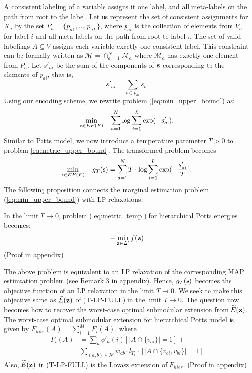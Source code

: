A consistent labeling of a variable assigns it one label, and all meta-labels on the path from root to the label. Let us represent the set of consistent assignments for $X_a$ by the set $P_a = \{p_{a1}, \dots, p_{aL}\}$, where $p_{ai}$ is the collection of elements from $V_a$ for label $i$ and all meta-labels on the path from root to label $i$. The set of valid labelings $A \subseteq V$ assigns each variable exactly one consistent label. This constraint can be formally written as $\mathcal{M} = \cap_{a = 1}^{N} \mathcal{M}_a$ where $\mathcal{M}_a$ has exactly one element from $P_a$. Let $s'_{ai}$ be the sum of the components of $\bf s$ corresponding to the elements
of $p_{ai}$, that is, 
\begin{equation}
s'_{ai} = \sum_{t \in p_{ai}} s_t.
\label{eq:tree_s}
\end{equation}
Using our encoding scheme, we rewrite problem (\ref{eq:min_upper_bound}) as:
\begin{equation}
\min_{{\bf s} \in EP(F)} \quad \sum_{a = 1}^{N} \log \sum_{i = 1}^L \exp(-s'_{ai}).
\label{eq:metric_upper_bound}
\end{equation}
%
 Similar to Potts model, we now introduce a temperature parameter $T > 0$ to problem \eqref{eq:metric_upper_bound}. The transformed problem becomes
\begin{equation}
    \min_{{\bf s} \in EP(F)} \quad g_T ({\bf s}) = \sum_{a = 1}^{N} T \cdot \log \sum_{i = 1}^L \exp(-\frac{s'_{ai}}{T}).
\label{eq:metric_temp}
\end{equation}
 The following proposition connects the marginal estimation problem (\ref{eq:min_upper_bound}) with LP relaxations:

{\proposition In the limit $T \to 0$, problem (\ref{eq:metric_temp}) for hierarchical Potts energies becomes:
\begin{align}
    - \min_{{\bf z} \in \Delta'} f({\bf z}) 
\end{align}
\label{proposition:metric_equiv}}
(Proof in appendix).

The above problem is equivalent to an LP relaxation of the corresponding MAP
estimtation problem (see Remark 3 in appendix). Hence, $g_T ({\bf s})$ becomes the objective function of an LP relaxation in the limit $T \to 0$. We seek to make this objective same as $\widetilde{E}({\bf z})$ of (T-LP-FULL) in the limit $T \to 0$. The question now becomes how to recover the  worst-case optimal submodular extension from $\widetilde{E}({\bf z})$.
%
{\proposition The  worst-case optimal submodular extension for hierarchical Potts model is given by $F_{hier}(A) = \sum_{i = 1}^M F_i(A)$, where
\begin{align}
    F_i(A) &= \sum_a \phi'_{a}(i) [|A \cap \{v_{ai}\}| = 1] + \nonumber \\
           &\sum_{(a, b) \in {\mathcal N}} {w_{ab}} \cdot l_{T_i} \cdot [|A \cap \{v_{ai}, v_{bi}\}| = 1]
\end{align}
Also, $\widetilde{E}({\bf z})$ in (T-LP-FULL) is the Lovasz extension of $F_{hier}$.
\label{proposition:rhst_worst-case optimal}}
(Proof in appendix)

